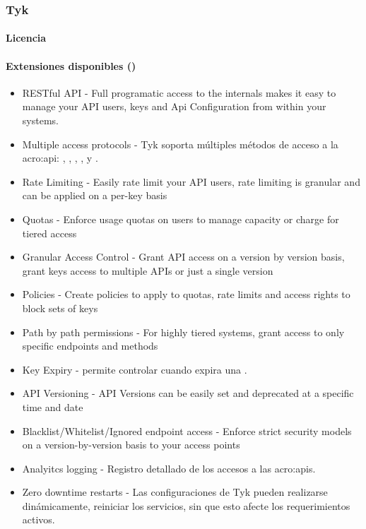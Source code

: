 \subsubsection{Tyk}
\label{soa:tecnologias:tyk}

\paragraph{Licencia}


\paragraph{Extensiones disponibles ()}

\begin{itemize}
  \item RESTful API - Full programatic access to the internals makes it easy to manage your API users, keys and Api Configuration from within your systems.
  \item Multiple access protocols - Tyk soporta múltiples métodos de acceso a la \gls{acro:api}: , , , ,  y .
  \item Rate Limiting - Easily rate limit your API users, rate limiting is granular and can be applied on a per-key basis
  \item Quotas - Enforce usage quotas on users to manage capacity or charge for tiered access
  \item Granular Access Control - Grant API access on a version by version basis, grant keys access to multiple APIs or just a single version
  \item Policies - Create policies to apply to quotas, rate limits and access rights to block sets of keys
  \item Path by path permissions - For highly tiered systems, grant access to only specific endpoints and methods
  \item Key Expiry - permite controlar cuando expira una .
  \item API Versioning - API Versions can be easily set and deprecated at a specific time and date
  \item Blacklist/Whitelist/Ignored endpoint access - Enforce strict security models on a version-by-version basis to your access points
  \item Analyitcs logging - Registro detallado de los accesos a las \glspl{acro:api}.
  \item Zero downtime restarts - Las configuraciones de Tyk pueden realizarse dinámicamente, reiniciar los servicios, sin que esto afecte los requerimientos activos.

\end{itemize}
